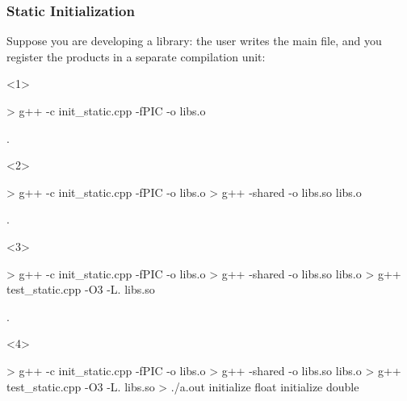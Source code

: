 \documentclass[aspectratio=43]{beamer}
\begin{document}
\begin{frame}[fragile]\frametitle{Static Initialization}
  Suppose you are developing a library: the user writes the main file, and you register the products in a separate compilation unit:

  \begin{onlyenv}<1>
\begin{Shelllisting}{}
> g++ -c init_static.cpp -fPIC -o libs.o




.
\end{Shelllisting}
  \end{onlyenv}
  \begin{onlyenv}<2>
\begin{Shelllisting}{}
> g++ -c init_static.cpp -fPIC -o libs.o
> g++ -shared -o libs.so libs.o



.
\end{Shelllisting}
  \end{onlyenv}
  \begin{onlyenv}<3>
\begin{Shelllisting}{}
> g++ -c init_static.cpp -fPIC -o libs.o
> g++ -shared -o libs.so libs.o
> g++ test_static.cpp -O3 -L. libs.so


.
\end{Shelllisting}
  \end{onlyenv}
  \begin{onlyenv}<4>
\begin{Shelllisting}{}
> g++ -c init_static.cpp -fPIC -o libs.o
> g++ -shared -o libs.so libs.o
> g++ test_static.cpp -O3 -L. libs.so
> ./a.out
initialize float
initialize double
\end{Shelllisting}
  \end{onlyenv}
\end{frame}
\end{document}
